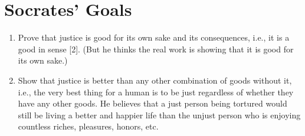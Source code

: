 \documentclass[oneside]{article}
\begin{document}





\section*{Socrates' Goals}

\begin{enumerate}
\item Prove that justice is good for its own sake and its consequences, i.e., it is a good in sense [2]. (But he thinks the real work is showing that it is good for its own sake.)
\item Show that justice is better than any other combination of goods without it, i.e., the very best thing for a human is to be just regardless of whether they have any other goods. He believes that a just person being tortured would still be living a better and happier life than the unjust person who is enjoying countless riches, pleasures, honors, etc.
\end{enumerate}



\end{document}
